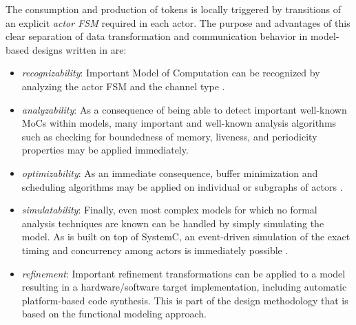 The consumption and production of tokens is locally triggered by transitions of an explicit \emph{actor FSM} required in each actor.
The purpose and advantages of this clear separation of data transformation and communication behavior in model-based designs written in \SysteMoC{} are:
\begin{itemize}
\item {\em recognizability}: Important Model of Computation can be recognized by analyzing the actor FSM and the channel type \cite{ZFHT08Class}.
\item {\em analyzability}: As a consequence of being able to detect important well-known MoCs within \SysteMoC{} models, many important and well-known analysis algorithms such as checking for boundedness of memory, liveness, and periodicity properties may be applied immediately.
\item {\em optimizability}: As an immediate consequence, buffer minimization and scheduling algorithms may be applied on individual or subgraphs of actors \cite{FKHTB08}.
\item {\em simulatability}: Finally, even most complex \SysteMoC{} models for which no formal analysis techniques are known can be handled by simply simulating the model. 
As \SysteMoC{} is built on top of SystemC, an event-driven simulation of the exact timing and concurrency among actors is immediately possible \cite{sfhtds:2006}.
\item {\em refinement}: Important refinement transformations can be applied to a \SysteMoC{} model resulting in a hardware/software target implementation, including automatic platform-based code synthesis.
This is part of the \SystemCoDesigner{} design methodology \cite{hfkssdht:2007, HMSK08} that is based on the \SysteMoC{} functional modeling approach. 
\end{itemize} 

